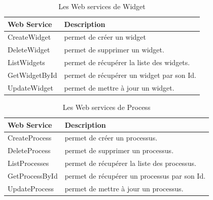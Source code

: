 \begin{table}[H]
    \centering
    \begin{tabular}{|m{5cm}|m{10cm}|}
        \hline
        \textbf{Web Service} & \textbf{Description}                      \\
        \hline
        CreateWidget         & permet de créer un widget                 \\
        \hline
        DeleteWidget         & permet de supprimer un widget.            \\
        \hline

        ListWidgets          & permet de récupérer la liste des widgets. \\
        \hline

        GetWidgetById        & permet de récupérer un widget par son Id. \\
        \hline

        UpdateWidget         & permet de mettre à jour un widget.        \\

        \hline
    \end{tabular}
    \caption{Les Web services de Widget}
    \label{tab:my_label}
\end{table}














\begin{table}[H]
    \centering
    \begin{tabular}{|m{5cm}|m{10cm}|}
        \hline
        \textbf{Web Service} & \textbf{Description}                         \\
        \hline
        CreateProcess        & permet de créer un processus.                \\
        \hline
        DeleteProcess        & permet de supprimer un processus.            \\
        \hline

        ListProcesses        & permet de récupérer la liste des processus.  \\
        \hline

        GetProcessById       & permet de récupérer un processus par son Id. \\
        \hline

        UpdateProcess        & permet de mettre à jour un processus.        \\

        \hline
    \end{tabular}
    \caption{Les Web services de Process}
    \label{tab:my_label}
\end{table}






